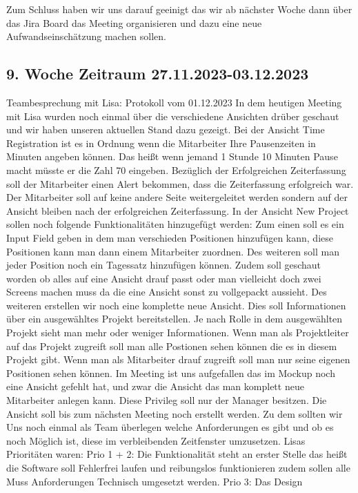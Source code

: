\documentclass{article}
\begin{document}
Zum Schluss haben wir uns darauf geeinigt das wir ab nächster Woche dann über
das Jira Board das Meeting organisieren und dazu eine neue Aufwandseinschätzung
machen sollen.

\subsection{9. Woche Zeitraum 27.11.2023-03.12.2023}
Teambesprechung mit Lisa: Protokoll vom 01.12.2023 In dem heutigen Meeting mit
Lisa wurden noch einmal über die verschiedene Ansichten drüber geschaut und wir
haben unseren aktuellen Stand dazu gezeigt. Bei der Ansicht Time Registration
ist es in Ordnung wenn die Mitarbeiter Ihre Pausenzeiten in Minuten angeben
können. Das heißt wenn jemand 1 Stunde 10 Minuten Pause macht müsste er die
Zahl 70 eingeben. Bezüglich der Erfolgreichen Zeiterfassung soll der
Mitarbeiter einen Alert bekommen, dass die Zeiterfassung erfolgreich war. Der
Mitarbeiter soll auf keine andere Seite weitergeleitet werden sondern auf der
Ansicht bleiben nach der erfolgreichen Zeiterfassung. In der Ansicht New
Project sollen noch folgende Funktionalitäten hinzugefügt werden: Zum einen
soll es ein Input Field geben in dem man verschieden Positionen hinzufügen
kann, diese Positionen kann man dann einem Mitarbeiter zuordnen. Des weiteren
soll man jeder Position noch ein Tagessatz hinzufügen können. Zudem soll
geschaut worden ob alles auf eine Ansicht drauf passt oder man vielleicht doch
zwei Screens machen muss da die eine Ansicht sonst zu vollgepackt aussieht. Des
weiteren erstellen wir noch eine komplette neue Ansicht. Dies soll
Informationen über ein ausgewähltes Projekt bereitstellen. Je nach Rolle in dem
ausgewählten Projekt sieht man mehr oder weniger Informationen. Wenn man als
Projektleiter auf das Projekt zugreift soll man alle Postionen sehen können die
es in diesem Projekt gibt. Wenn man als Mitarbeiter drauf zugreift soll man nur
seine eigenen Positionen sehen können. Im Meeting ist uns aufgefallen das im
Mockup noch eine Ansicht gefehlt hat, und zwar die Ansicht das man komplett
neue Mitarbeiter anlegen kann. Diese Privileg soll nur der Manager besitzen.
Die Ansicht soll bis zum nächsten Meeting noch erstellt werden. Zu dem sollten
wir Uns noch einmal als Team überlegen welche Anforderungen es gibt und ob es
noch Möglich ist, diese im verbleibenden Zeitfenster umzusetzen. Lisas
Prioritäten waren: Prio 1 + 2: Die Funktionalität steht an erster Stelle das
heißt die Software soll Fehlerfrei laufen und reibungslos funktionieren zudem
sollen alle Muss Anforderungen Technisch umgesetzt werden. Prio 3: Das Design
\end{document}
